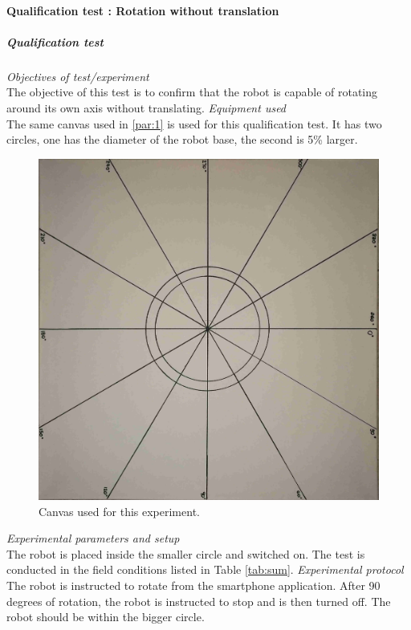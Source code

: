 \paragraph{Qualification test  : Rotation without translation}
\subparagraph{Qualification test}
\textit{Objectives of test/experiment}\\
The objective of this test is to confirm that the robot is capable of rotating around its own axis without translating.
\textit{Equipment used}\\
The same canvas used in \ref{par:1} is used for this qualification test. It has two circles, one has the diameter of the robot base, the second is 5\% larger.
\begin{figure}[H]
\centering
\includegraphics[scale = 1]{pics/Res2.jpg}
\caption{Canvas used for this experiment.}
\label{fig:Res2}
\end{figure}
\textit{Experimental parameters and setup }\\
The robot is placed inside the smaller circle and switched on. The test is conducted in the field conditions listed in Table \ref{tab:sum}.
\textit{Experimental protocol}\\
The robot is instructed to rotate from the smartphone application. After 90 degrees of rotation, the robot is instructed to stop and is then turned off. The robot should be within the bigger circle.
